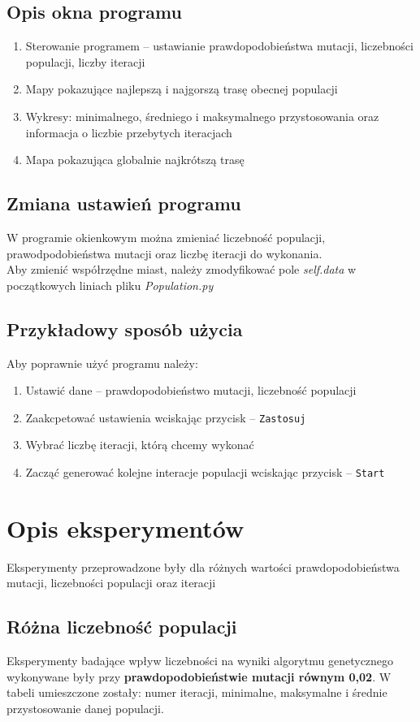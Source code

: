 \documentclass[a4paper,11pt]{article}
\begin{document}
		\subsection{Opis okna programu}
				\begin{enumerate}
					\item Sterowanie programem -- ustawianie prawdopodobieństwa mutacji, liczebności populacji, liczby iteracji
					\item Mapy pokazujące najlepszą i najgorszą trasę obecnej populacji
					\item Wykresy: minimalnego, średniego i maksymalnego przystosowania oraz informacja o liczbie przebytych iteracjach
					\item Mapa pokazująca globalnie najkrótszą trasę
				\end{enumerate}	
		\subsection{Zmiana ustawień programu}
			W programie okienkowym można zmieniać liczebność populacji, prawodpodobieństwa mutacji oraz liczbę iteracji do wykonania.\\
			Aby zmienić współrzędne miast, należy zmodyfikować pole \textit{self.data} w początkowych liniach pliku \textit{Population.py}
		\subsection{Przykładowy sposób użycia}
		Aby poprawnie użyć programu należy:
		\begin{enumerate}
		\item Ustawić dane -- prawdopodobieństwo mutacji, liczebność populacji
		\item Zaakcpetować ustawienia wciskając przycisk -- \texttt{Zastosuj}
		\item Wybrać liczbę iteracji, którą chcemy wykonać
		\item Zacząć generować kolejne interacje populacji wciskając przycisk -- \texttt{Start}
		\end{enumerate}
		
	\section{Opis eksperymentów}
	Eksperymenty przeprowadzone były dla różnych wartości prawdopodobieństwa mutacji, liczebności populacji oraz iteracji
	
		\subsection{Różna liczebność populacji}
			Eksperymenty badające wpływ liczebności na wyniki algorytmu genetycznego wykonywane były przy \textbf{prawdopodobieństwie mutacji równym 0,02}. W tabeli umieszczone zostały: numer iteracji, minimalne, maksymalne i średnie przystosowanie danej populacji.
\end{document}
